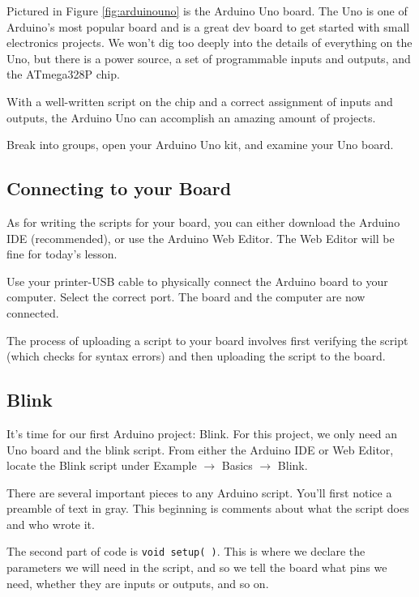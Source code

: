 \noindent Pictured in Figure \ref{fig:arduinouno} is the Arduino Uno board. The Uno is one of Arduino's most popular board and is a great dev board to get started with small electronics projects. We won't dig too deeply into the details of everything on the Uno, but there is a power source, a set of programmable inputs and outputs, and the ATmega328P chip.

\noindent With a well-written script on the chip and a correct assignment of inputs and outputs, the Arduino Uno can accomplish an amazing amount of projects.

\begin{exercise}
Break into groups, open your Arduino Uno kit, and examine your Uno board.
\end{exercise}

\subsection{Connecting to your Board}

As for writing the scripts for your board, you can either download the Arduino IDE (recommended), or use the Arduino Web Editor. The Web Editor will be fine for today's lesson.

\noindent Use your printer-USB cable to physically connect the Arduino board to your computer. Select the correct port. The board and the computer are now connected.

\noindent The process of uploading a script to your board involves first verifying the script (which checks for syntax errors) and then uploading the script to the board.

\subsection{Blink}

It's time for our first Arduino project: Blink. For this project, we only need an Uno board and the blink script. From either the Arduino IDE or Web Editor, locate the Blink script under Example $\rightarrow$ Basics $\rightarrow$ Blink.

\noindent There are several important pieces to any Arduino script. You'll first notice a preamble of text in gray. This beginning is comments about what the script does and who wrote it.

\noindent The second part of code is \lstinline$void setup( )$. This is where we declare the parameters we will need in the script, and so we tell the board what pins we need, whether they are inputs or outputs, and so on. 

